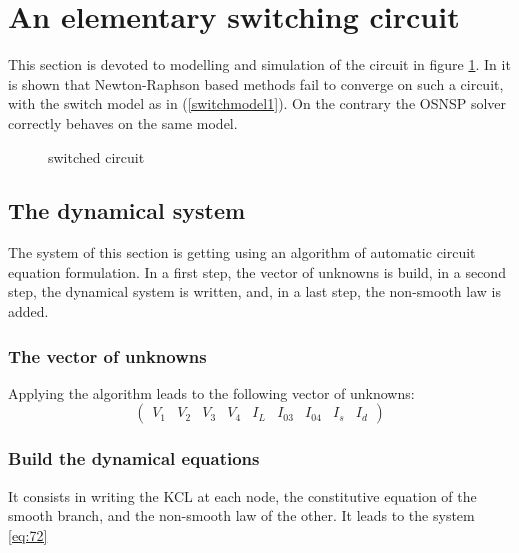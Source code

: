 \documentclass{article}
\begin{document}
\section{An elementary switching circuit}
\label{section3}


This section is devoted to modelling and simulation of the circuit in figure \ref{fig:figcircuit1}. In \cite{maffezzoni2006} it is shown that Newton-Raphson based methods fail to converge on such a circuit, with the switch model as in (\ref{switchmodel1}). On the contrary the OSNSP solver correctly behaves on the same model.  

\begin{figure}[h]
  \centering
   \scalebox{0.9}{
  
  }
  \caption{switched circuit}
  \label{fig:figcircuit1}
\end{figure}

\subsection{The dynamical system}
\label{section31}
The system of this section is getting using an algorithm of automatic circuit equation formulation.
In a first step, the vector of unknowns is build, in a second step, the dynamical system is
written, and, in a last step, the non-smooth law is added.

\subsubsection{The vector of unknowns}
Applying the algorithm leads to the following vector of unknowns:
\[\left(\begin{array}{ccccccccc}
V_1&V_2&V_3&V_4&I_L&I_{03}&I_{04}&I_s&I_d
\end{array}\right)\]
\subsubsection{Build the dynamical equations}
It consists in writing the KCL at each node, the constitutive equation of the smooth branch, and the
non-smooth law of the other. It leads to the  system \ref{eq:72}
\end{document}
